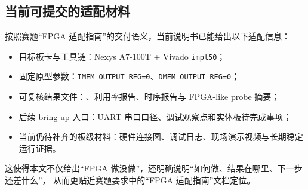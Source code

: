 \subsection{当前可提交的适配材料}

按照赛题“FPGA 适配指南”的交付语义，当前说明书已能给出以下适配信息：
\begin{itemize}
    \item 目标板卡与工具链：Nexys A7-100T + Vivado \texttt{impl50}；
    \item 固定原型参数：\texttt{IMEM\_OUTPUT\_REG=0}、\texttt{DMEM\_OUTPUT\_REG=0}；
    \item 可复核结果文件：、利用率报告、时序报告与 FPGA-like probe 摘要；
    \item 后续 bring-up 入口：UART 串口口径、调试观察点和实体板待完成事项；
    \item 当前仍待补齐的板级材料：硬件连接图、调试日志、现场演示视频与长期稳定运行证据。
\end{itemize}

这使得本文不仅给出“FPGA 做没做”，还明确说明“如何做、结果在哪里、下一步还差什么”，
从而更贴近赛题要求中的“FPGA 适配指南”文档定位。
